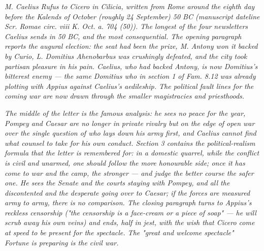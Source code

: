 
\textit{M. Caelius Rufus to Cicero in Cilicia, written from
Rome around the eighth day before the Kalends of October
(roughly 24 September) 50 BC (manuscript dateline
\textit{Scr. Romae circ. viii K. Oct. a. 704 (50)}).
The longest of the four newsletters Caelius sends in 50 BC,
and the most consequential. The opening paragraph reports
the augural election: the seat had been the prize, M. Antony
won it backed by Curio, L. Domitius Ahenobarbus was crushingly
defeated, and the city took partisan pleasure in his pain.
Caelius, who had backed Antony, is now Domitius's bitterest
enemy --- the same Domitius who in section 1 of \textit{Fam.}
8.12 was already plotting with Appius against Caelius's
aedileship. The political fault lines for the coming war are
now drawn through the smaller magistracies and priesthoods.}

\textit{The middle of the letter is the famous analysis: he
sees no peace for the year, Pompey and Caesar are no longer
in private rivalry but on the edge of open war over the
single question of who lays down his army first, and Caelius
cannot find what counsel to take for his own conduct. Section
3 contains the political-realism formula that the letter is
remembered for: in a domestic quarrel, while the conflict is
civil and unarmed, one should follow the more honourable
side; once it has come to war and the camp, the stronger ---
and judge the better course the safer one. He sees the
Senate and the courts staying with Pompey, and all the
discontented and the desperate going over to Caesar; if the
forces are measured army to army, there is no comparison.
The closing paragraph turns to Appius's reckless censorship
("the censorship is a face-cream or a piece of soap" --- he
will scrub away his own veins) and ends, half in jest, with
the wish that Cicero come at speed to be present for the
spectacle. The "great and welcome spectacle" Fortune is
preparing is the civil war.}
